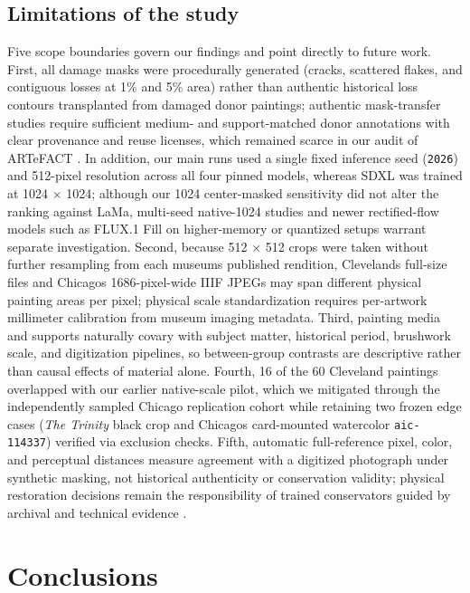 \documentclass[applsci,article,submit,pdftex,moreauthors]{Definitions/mdpi}
\begin{document}
\subsection{Limitations of the study}\label{limitations-of-the-study}

Five scope boundaries govern our findings and point directly to future work. First, all damage masks were procedurally generated (cracks, scattered flakes, and contiguous losses at 1\% and 5\% area) rather than authentic historical loss contours transplanted from damaged donor paintings; authentic mask-transfer studies require sufficient medium- and support-matched donor annotations with clear provenance and reuse licenses, which remained scarce in our audit of ARTeFACT \citep{ivanova2024artefact}. In addition, our main runs used a single fixed inference seed (\texttt{2026}) and 512-pixel resolution across all four pinned models, whereas SDXL was trained at 1024 \ensuremath{\times} 1024; although our 1024 center-masked sensitivity did not alter the ranking against LaMa, multi-seed native-1024 studies and newer rectified-flow models such as FLUX.1 Fill \citep{fluxfill} on higher-memory or quantized setups warrant separate investigation. Second, because 512 \ensuremath{\times} 512 crops were taken without further resampling from each museum\textquotesingle s published rendition, Cleveland\textquotesingle s full-size files and Chicago\textquotesingle s 1686-pixel-wide IIIF JPEGs may span different physical painting areas per pixel; physical scale standardization requires per-artwork millimeter calibration from museum imaging metadata. Third, painting media and supports naturally covary with subject matter, historical period, brushwork scale, and digitization pipelines, so between-group contrasts are descriptive rather than causal effects of material alone. Fourth, 16 of the 60 Cleveland paintings overlapped with our earlier native-scale pilot, which we mitigated through the independently sampled Chicago replication cohort while retaining two frozen edge cases (\emph{The Trinity} black crop and Chicago\textquotesingle s card-mounted watercolor \texttt{aic-114337}) verified via exclusion checks. Fifth, automatic full-reference pixel, color, and perceptual distances measure agreement with a digitized photograph under synthetic masking, not historical authenticity or conservation validity; physical restoration decisions remain the responsibility of trained conservators guided by archival and technical evidence \citep{aic1994, icomcc2008}.

\section{Conclusions}\label{conclusions}
\end{document}
